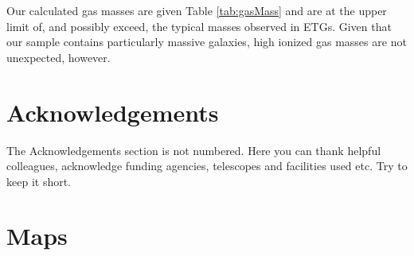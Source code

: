 \documentclass[a4paper,fleqn,usenatbib]{mnras}
\begin{document}
	Our calculated gas masses are given Table \ref{tab:gasMass} and are at the upper limit of, and possibly exceed, the typical masses observed in ETGs. Given that our sample contains particularly massive galaxies, high ionized gas masses are not unexpected, however.






















\section*{Acknowledgements}

The Acknowledgements section is not numbered. Here you can thank helpful
colleagues, acknowledge funding agencies, telescopes and facilities used etc.
Try to keep it short.









\appendix
\section{Maps}
	\label{sec:Maps}



\bsp	%
\label{lastpage}
\end{document}
